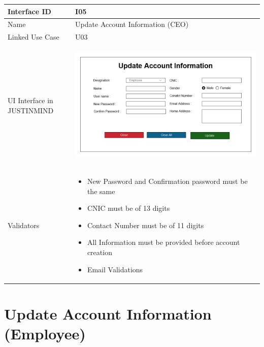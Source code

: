 \documentclass[12pt,a4paper]{report}
\begin{document}
\begin{tabular}{ | m{3cm} | m{12cm}| } \hline

Interface ID &  I05 \\\hline

Name  	      &  Update Account Information (CEO) \\ \hline

Linked Use Case & U03 \\ \hline

UI Interface in JUSTINMIND & \begin{center} \includegraphics[scale=0.3]{./User Interface/UI-005a Update Account Information.png}\end{center}  \\ \hline

Validators & 
\begin{itemize}
\item   New Password and Confirmation password must be the same
\item CNIC must be of 13 digits
\item Contact Number must be of 11 digits
\item All Information must be provided before account creation
\item Email Validations


\end{itemize}
\\ \hline

\end{tabular} 

\section{Update Account Information (Employee)}
\end{document}
